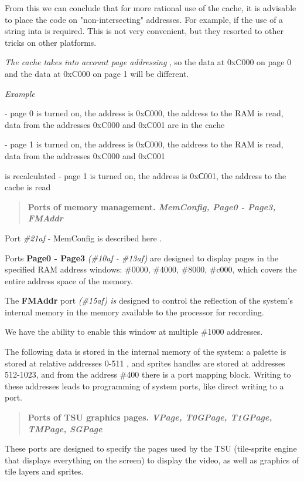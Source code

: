 \documentclass{article}
\begin{document}
From this we can conclude that for more rational use of the cache, it
is advisable to place the code on "non-intersecting" addresses. For
example, if the use of a string inta is required. This is not very
convenient, but they resorted to other tricks on other platforms.

\emph{The cache takes into account page addressing} , so the data at
0xC000 on page 0 and the data at 0xC000 on page 1 will be different.

\emph{Example}

- page 0 is turned on, the address is 0xС000, the address to the RAM
is read, data from the addresses 0xC000 and 0xC001 are in the cache

- page 1 is turned on, the address is 0xС000, the address to the RAM
is read, data from the addresses 0xC000 and 0xC001

is recalculated - page 1 is turned on, the address is 0xС001, the
address to the cache is read

\begin{quotation}
  \textbf{Ports of memory management. \emph{MemConfig, Page0 - Page3,
      FMAddr}}
\end{quotation}
Port \emph{\#21af} - MemConfig is described here .

Ports \textbf{Page0 - Page3 }\emph{(\#10af - \#13af)} are designed to
display pages in the specified RAM address windows: \#0000, \#4000,
\#8000, \#c000, which covers the entire address space of the memory.

The \textbf{FMAddr} port \emph{(\#15af) is} designed to control the
reflection of the system's internal memory in the memory available to
the processor for recording.

We have the ability to enable this window at multiple \#1000
addresses.

The following data is stored in the internal memory of the system: a
palette is stored at relative addresses 0-511 , and sprites handles
are stored at addresses 512-1023, and from the address \#400 there is
a port mapping block. Writing to these addresses leads to programming
of system ports, like direct writing to a port.

\begin{quotation}
  \textbf{Ports of TSU graphics pages. \emph{VPage, T0GPage, T1GPage,
      TMPage, SGPage}}
\end{quotation}
These ports are designed to specify the pages used by the TSU
(tile-sprite engine that displays everything on the screen) to display
the video, as well as graphics of tile layers and sprites.
\end{document}

